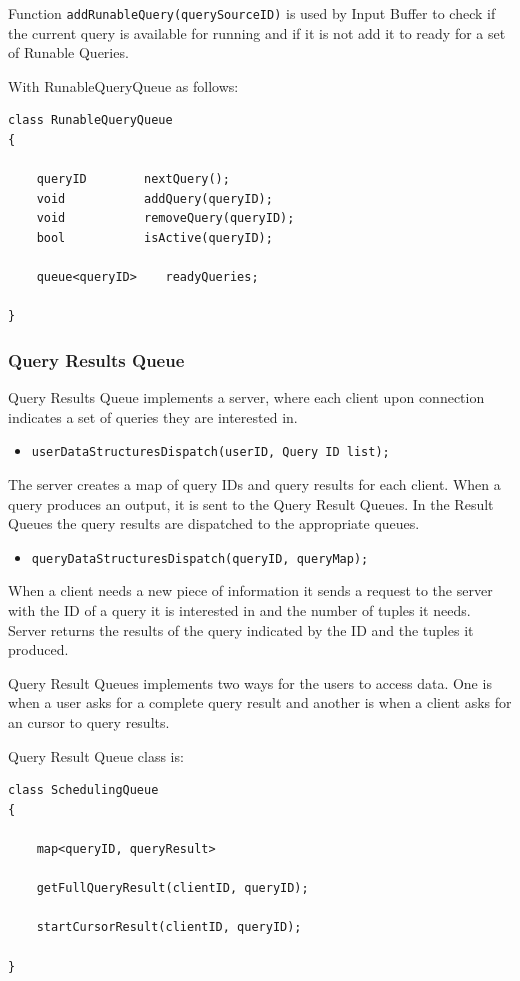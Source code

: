 \documentclass[14pt]{article}
\begin{document}
Function {\tt addRunableQuery(querySourceID)} is used by Input Buffer to check if the current query is available for running and if it is not add it to ready for a set of Runable Queries.

\noindent With RunableQueryQueue as follows:

\begin{verbatim}
class RunableQueryQueue
{
    
    queryID        nextQuery();
    void           addQuery(queryID);
    void           removeQuery(queryID);
    bool           isActive(queryID);

    queue<queryID>    readyQueries;
	
}
\end{verbatim}


\subsubsection{Query Results Queue}

Query Results Queue implements a server, where each client upon connection indicates a set of queries they are interested in.

\begin{itemize}
	\item {\tt userDataStructuresDispatch(userID, Query ID list);}
\end{itemize}

\noindent The server creates a map of query IDs and query results for each client. When a query produces an output, it is sent to the Query Result Queues. In the Result Queues the query results are dispatched to the appropriate queues.

\begin{itemize}
	\item {\tt queryDataStructuresDispatch(queryID, queryMap);}
\end{itemize}

\noindent When a client needs a new piece of information it sends a request to the server with the ID of a query it is interested in and the number of tuples it needs. Server returns the results of the query indicated by the ID and the tuples it produced. 

Query Result Queues implements two ways for the users to access data. One is when a user asks for a complete query result and another is when a client asks for an cursor to query results.

Query Result Queue class is:

\begin{verbatim}
class SchedulingQueue
{
    
	map<queryID, queryResult>
	
	getFullQueryResult(clientID, queryID);
	
	startCursorResult(clientID, queryID);
	
}
\end{verbatim}
\end{document}
